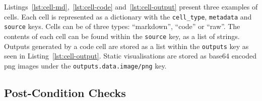 \documentclass[conference]{IEEEtran}
\begin{document}
Listings~\ref{lst:cell-md},~\ref{lst:cell-code} and~\ref{lst:cell-output} present three examples of cells. Each cell is represented as a dictionary with the \texttt{cell\_type}, \texttt{metadata} and \texttt{source} keys. Cells can be of three types: ``markdown'', ``code'' or ``raw''. The contents of each cell can be found within the \texttt{source} key, as a list of strings. Outputs generated by a code cell are stored as a list within the \texttt{outputs} key as seen in Listing~\ref{lst:cell-output}. Static visualisations are stored as base64 encoded png images under the \texttt{outputs.data.image/png} key.

\subsection{Post-Condition Checks}\label{sec:post-cond}
\end{document}
